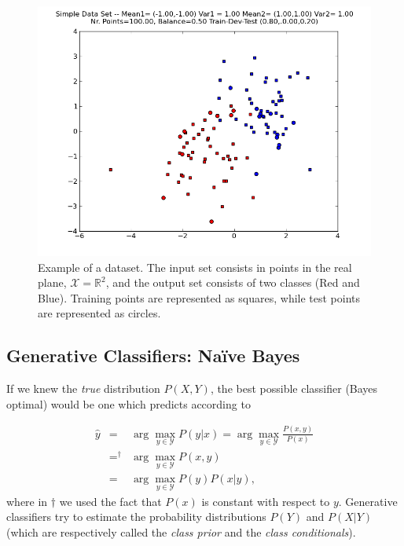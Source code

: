 \begin{figure}
\begin{center}
    \includegraphics[width=1\columnwidth]{figs/classification/simple_data_set}
  \caption{\label{simpleDataSet} Example of a dataset.
    The input set consists in points in the real plane, $\mathcal{X} =
    \mathbb{R}^2$, and the output set consists of two classes (Red
    and Blue). Training points are represented as squares, while test
    points are represented as circles.}
  \end{center}
\end{figure}

\subsection{\label{s::naiveBayes}Generative Classifiers: Na\"{i}ve Bayes}

If we knew the \emph{true} distribution $P(X,Y)$, the best possible classifier (Bayes optimal) 
would be one which predicts according to

\begin{eqnarray}
{\hat y} &=& \arg\max_{y \in \mathcal{Y}} P(y|x) = \arg\max_{y \in \mathcal{Y}} \frac{P(x,y)}{P(x)} \nonumber\\
&=^{\dagger}& \arg\max_{y \in \mathcal{Y}} P(x,y) \nonumber \\
&=& \arg\max_{y \in \mathcal{Y}} P(y) P(x|y),
\end{eqnarray}
where in ${\dagger}$ we used the fact that $P(x)$ is constant with respect to $y$. Generative classifiers try to estimate the probability distributions $P(Y)$ and $P(X|Y)$ (which are respectively called the \emph{class prior} and the \emph{class conditionals}).
  
